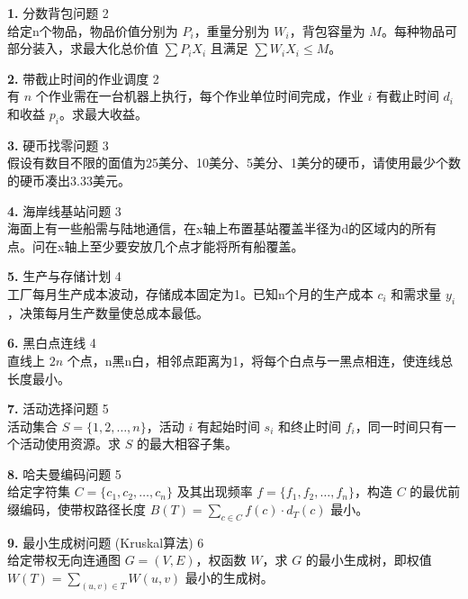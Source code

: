\vspace{8pt}
\textbf{1.} 分数背包问题 \hfill 2\\
给定n个物品，物品价值分别为 $P_i$，重量分别为 $W_i$，背包容量为 $M$。每种物品可部分装入，求最大化总价值 $\sum P_i X_i$ 且满足 $\sum W_i X_i \le M$。

\vspace{8pt}
\textbf{2.} 带截止时间的作业调度 \hfill 2\\
有 $n$ 个作业需在一台机器上执行，每个作业单位时间完成，作业 $i$ 有截止时间 $d_i$ 和收益 $p_i$。求最大收益。

\vspace{8pt}
\textbf{3.} 硬币找零问题 \hfill 3\\
假设有数目不限的面值为25美分、10美分、5美分、1美分的硬币，请使用最少个数的硬币凑出3.33美元。

\vspace{8pt}
\textbf{4.} 海岸线基站问题 \hfill 3\\
海面上有一些船需与陆地通信，在x轴上布置基站覆盖半径为d的区域内的所有点。问在x轴上至少要安放几个点才能将所有船覆盖。

\vspace{8pt}
\textbf{5.} 生产与存储计划 \hfill 4\\
工厂每月生产成本波动，存储成本固定为1。已知n个月的生产成本 $c_i$ 和需求量 $y_i$，决策每月生产数量使总成本最低。

\vspace{8pt}
\textbf{6.} 黑白点连线 \hfill 4\\
直线上 $2n$ 个点，n黑n白，相邻点距离为1，将每个白点与一黑点相连，使连线总长度最小。

\vspace{8pt}
\textbf{7.} 活动选择问题 \hfill 5\\
活动集合 $S=\{1,2,\ldots,n\}$，活动 $i$ 有起始时间 $s_i$ 和终止时间 $f_i$，同一时间只有一个活动使用资源。求 $S$ 的最大相容子集。

\vspace{8pt}
\textbf{8.} 哈夫曼编码问题 \hfill 5\\
给定字符集 $C=\{c_1,c_2,\ldots,c_n\}$ 及其出现频率 $f=\{f_1,f_2,\ldots,f_n\}$，构造 $C$ 的最优前缀编码，使带权路径长度 $B(T)=\sum_{c \in C} f(c) \cdot d_T(c)$ 最小。

\vspace{8pt}
\textbf{9.} 最小生成树问题 (Kruskal算法) \hfill 6\\
给定带权无向连通图 $G=(V,E)$，权函数 $W$，求 $G$ 的最小生成树，即权值 $W(T)=\sum_{(u,v) \in T} W(u,v)$ 最小的生成树。

